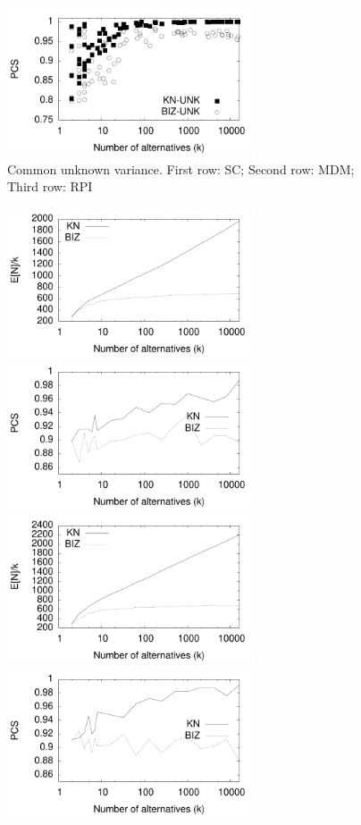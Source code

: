 \documentclass[12pt]{article}
\begin{document}
\begin{figure}[tb]
    \includegraphics[width=2.9in]{pdf/FINAL-UNK-RPI-PCS}

    \caption{Common unknown variance.  
    First row: SC;
    Second row: MDM;
    Third row: RPI}
  \end{figure}

 
  \begin{figure}[tb]
    \center
    \includegraphics[width=2.9in]{pdf/FINAL-SCINCA-Nk} 
    \includegraphics[width=2.9in]{pdf/FINAL-SCINCA-PCS}
    \includegraphics[width=2.9in]{pdf/FINAL-SCDECA-Nk} 
    \includegraphics[width=2.9in]{pdf/FINAL-SCDECA-PCS}

\end{figure}
\end{document}
